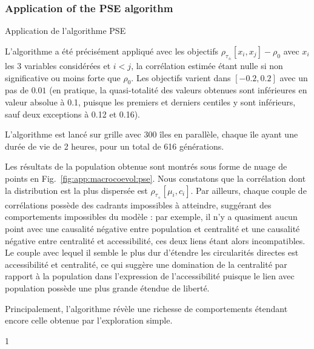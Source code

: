 \subsubsection{Application of the PSE algorithm}{Application de l'algorithme PSE}


L'algorithme a été précisément appliqué avec les objectifs $\rho_{\tau_{\pm}}\left[x_i,x_j\right] - \rho_0$ avec $x_i$ les 3 variables considérées et $i<j$, la corrélation estimée étant nulle si non significative ou moins forte que $\rho_0$. Les objectifs varient dans $\left[-0.2,0.2\right]$ avec un pas de $0.01$ (en pratique, la quasi-totalité des valeurs obtenues sont inférieures en valeur absolue à 0.1, puisque les premiers et derniers centiles y sont inférieurs, sauf deux exceptions à 0.12 et 0.16).

L'algorithme est lancé sur grille avec 300 îles en parallèle, chaque île ayant une durée de vie de 2 heures, pour un total de 616 générations.

Les résultats de la population obtenue sont montrés sous forme de nuage de points en Fig.~\ref{fig:app:macrocoevol:pse}. Nous constatons que la corrélation dont la distribution est la plus dispersée est $\rho_{\tau_+}\left[\mu_i,c_i\right]$. Par ailleurs, chaque couple de corrélations possède des cadrants impossibles à atteindre, suggérant des comportements impossibles du modèle : par exemple, il n'y a quasiment aucun point avec une causalité négative entre population et centralité et une causalité négative entre centralité et accessibilité, ces deux liens étant alors incompatibles. Le couple avec lequel il semble le plus dur d'étendre les circularités directes est accessibilité et centralité, ce qui suggère une domination de la centralité par rapport à la population dans l'expression de l'accessibilité puisque le lien avec population possède une plus grande étendue de liberté.

Principalement, l'algorithme révèle une richesse de comportements étendant encore celle obtenue par l'exploration simple.


         1%



